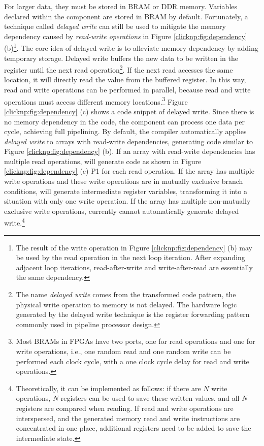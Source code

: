 For larger data, they must be stored in BRAM or DDR memory. Variables declared within the component are stored in BRAM by default. Fortunately, a technique called \textit{delayed write} can still be used to mitigate the memory dependency caused by \textit{read-write operations} in Figure \ref{clicknp:fig:dependency} (b)\footnote{The result of the write operation in Figure \ref{clicknp:fig:dependency} (b) may be used by the read operation in the next loop iteration. After expanding adjacent loop iterations, read-after-write and write-after-read are essentially the same dependency.}. The core idea of delayed write is to alleviate memory dependency by adding temporary storage. Delayed write buffers the new data to be written in the register until the next read operation\footnote{The name \textit{delayed write} comes from the transformed code pattern, the physical write operation to memory is not delayed. The hardware logic generated by the delayed write technique is the register forwarding pattern commonly used in pipeline processor design.}. If the next read accesses the same location, it will directly read the value from the buffered register. In this way, read and write operations can be performed in parallel, because read and write operations must access different memory locations.\footnote{Most BRAMs in FPGAs have two ports, one for read operations and one for write operations, i.e., one random read and one random write can be performed each clock cycle, with a one clock cycle delay for read and write operations.} Figure \ref{clicknp:fig:dependency} (c) shows a code snippet of delayed write. Since there is no memory dependency in the code, the component can process one data per cycle, achieving full pipelining. By default, the \name compiler automatically applies \textit{delayed write} to arrays with read-write dependencies, generating code similar to Figure \ref{clicknp:fig:dependency} (b). If an array with read-write dependencies has multiple read operations, \name{} will generate code as shown in Figure \ref{clicknp:fig:dependency} (c) P1 for each read operation. If the array has multiple write operations and these write operations are in mutually exclusive branch conditions, \name{} will generate intermediate register variables, transforming it into a situation with only one write operation. If the array has multiple non-mutually exclusive write operations, \name{} currently cannot automatically generate delayed write.\footnote{Theoretically, it can be implemented as follows: if there are $N$ write operations, $N$ registers can be used to save these written values, and all $N$ registers are compared when reading. If read and write operations are interspersed, and the generated memory read and write instructions are concentrated in one place, additional registers need to be added to save the intermediate state.}

